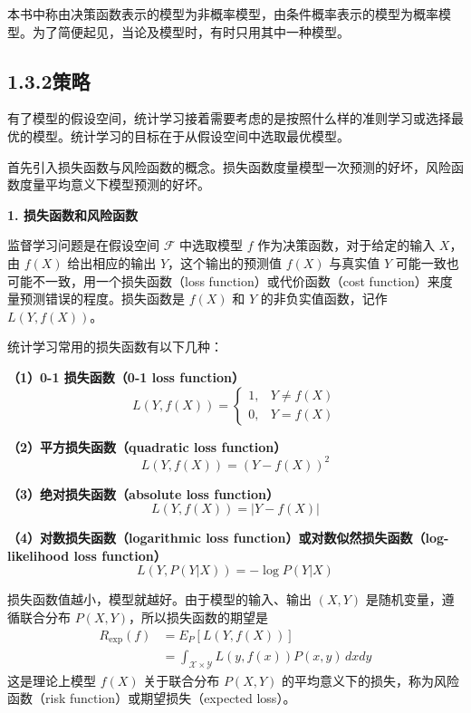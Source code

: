 \documentclass[UTF8, 12pt, fontset=fandol, oneside]{ctexart}
\begin{document}
本书中称由决策函数表示的模型为非概率模型，由条件概率表示的模型为概率模型。为了简便起见，当论及模型时，有时只用其中一种模型。

\subsection*{1.3.2\quad 策略}

有了模型的假设空间，统计学习接着需要考虑的是按照什么样的准则学习或选择最优的模型。统计学习的目标在于从假设空间中选取最优模型。

首先引入损失函数与风险函数的概念。损失函数度量模型一次预测的好坏，风险函数度量平均意义下模型预测的好坏。

\noindent\textbf{1. 损失函数和风险函数}

监督学习问题是在假设空间 $\mathcal F$ 中选取模型 $f$ 作为决策函数，对于给定的输入 $X$，由 $f(X)$ 给出相应的输出 $Y$，这个输出的预测值 $f(X)$ 与真实值 $Y$ 可能一致也可能不一致，用一个损失函数（loss function）或代价函数（cost function）来度量预测错误的程度。损失函数是 $f(X)$ 和 $Y$ 的非负实值函数，记作 $L(Y,f(X))$。

统计学习常用的损失函数有以下几种：

\noindent\textbf{（1）0-1 损失函数（0-1 loss function）}
\begin{equation}
  L(Y,f(X))=
  \begin{cases}
    1, & Y\ne f(X)\\
    0, & Y=f(X)
  \end{cases}
  \tag{1.9}
\end{equation}

\noindent\textbf{（2）平方损失函数（quadratic loss function）}
\begin{equation}
  L(Y,f(X))=(Y-f(X))^2
  \tag{1.10}
\end{equation}

\noindent\textbf{（3）绝对损失函数（absolute loss function）}
\begin{equation}
  L(Y,f(X))=|Y-f(X)|
  \tag{1.11}
\end{equation}

\noindent\textbf{（4）对数损失函数（logarithmic loss function）或对数似然损失函数（log-likelihood loss function）}
\begin{equation}
  L(Y,P(Y|X))=-\log P(Y|X)
  \tag{1.12}
\end{equation}

损失函数值越小，模型就越好。由于模型的输入、输出 $(X,Y)$ 是随机变量，遵循联合分布 $P(X,Y)$，所以损失函数的期望是
\begin{equation}
\begin{aligned}
  R_{\exp}(f)
  &=E_P[L(Y,f(X))]\\
  &=\int_{\mathcal X\times\mathcal Y} L(y,f(x))P(x,y)\,dxdy
\end{aligned}
  \tag{1.13}
\end{equation}
这是理论上模型 $f(X)$ 关于联合分布 $P(X,Y)$ 的平均意义下的损失，称为风险函数（risk function）或期望损失（expected loss）。
\end{document}
